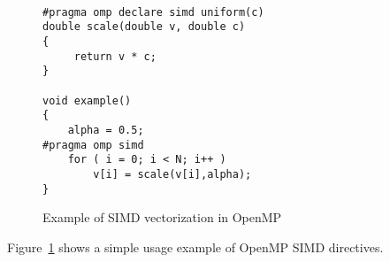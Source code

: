 \begin{figure}
\begin{lstlisting}

#pragma omp declare simd uniform(c)
double scale(double v, double c)
{
     return v * c;
}

void example()
{
    alpha = 0.5;
#pragma omp simd 
    for ( i = 0; i < N; i++ )
        v[i] = scale(v[i],alpha);
}

\end{lstlisting}
\caption{Example of SIMD vectorization in OpenMP}
\label{fig:simd-example}
\end{figure}

Figure~\ref{fig:simd-example} shows a simple usage example of OpenMP SIMD directives. %